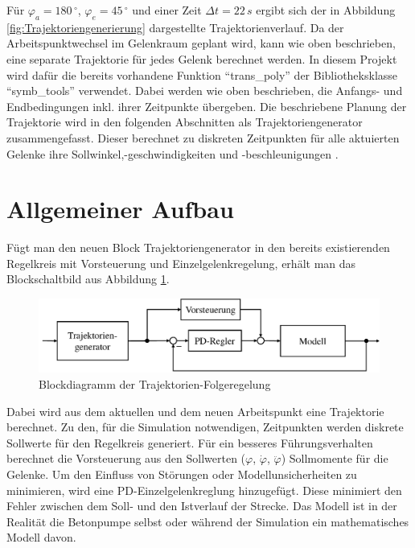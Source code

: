 Für $\varphi_a= 180\,^\circ$, $\varphi_e= 45\,^\circ$ und einer Zeit $\Delta t=22\,\si{s}$ ergibt sich der in Abbildung \ref{fig:Trajektoriengenerierung} dargestellte Trajektorienverlauf.\newline	 
Da der Arbeitspunktwechsel im Gelenkraum geplant wird, kann wie oben beschrieben, eine separate Trajektorie für jedes Gelenk berechnet werden.\newline
In diesem Projekt wird dafür die bereits vorhandene Funktion "`trans\_poly"' der Bibliotheksklasse "`symb\_tools"' verwendet. Dabei werden wie oben beschrieben, die Anfangs- und Endbedingungen inkl. ihrer Zeitpunkte übergeben.\newline
Die beschriebene Planung der Trajektorie wird in den folgenden Abschnitten als Trajektoriengenerator zusammengefasst. Dieser berechnet zu diskreten Zeitpunkten für alle aktuierten Gelenke ihre Sollwinkel,-geschwindigkeiten und -beschleunigungen .  	
\section{Allgemeiner Aufbau}
Fügt man den neuen Block Trajektoriengenerator in den bereits existierenden Regelkreis mit Vorsteuerung und Einzelgelenkregelung, erhält man das Blockschaltbild aus Abbildung \ref{fig:Blockdiagramm_Trajektorien_Folgeregelung}. \newline
	\begin{figure}[h!]
		\centering
		\includegraphics[scale=0.7]{Bilder/Blockdiagramm_Trajektorien_Folgeregelung.pdf}
		\caption{Blockdiagramm der Trajektorien-Folgeregelung}
		\label{fig:Blockdiagramm_Trajektorien_Folgeregelung}
	\end{figure}\newline 
Dabei wird aus dem aktuellen und dem neuen Arbeitspunkt eine Trajektorie berechnet. Zu den, für die Simulation notwendigen, Zeitpunkten werden diskrete Sollwerte für den Regelkreis generiert. Für ein besseres Führungsverhalten berechnet die Vorsteuerung aus den Sollwerten ($\varphi$, $\dot{\varphi}$, $\ddot{\varphi}$) Sollmomente für die Gelenke.\newline
Um den Einfluss von Störungen oder Modellunsicherheiten zu minimieren, wird eine PD-Einzelgelenkreglung hinzugefügt. Diese minimiert den Fehler zwischen dem Soll- und den Istverlauf der Strecke. \newline
Das Modell ist in der Realität die Betonpumpe selbst oder während der Simulation ein mathematisches Modell davon. 
